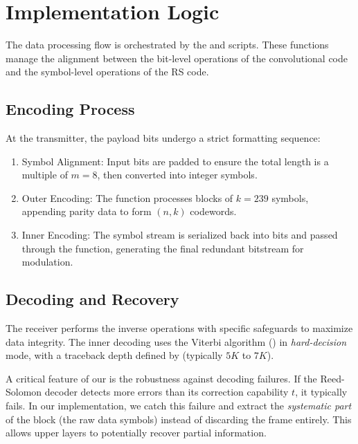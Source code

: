 \section{Implementation Logic} \label{sec:Coding_Implementation}

The data processing flow is orchestrated by the  and  scripts. These functions manage the alignment between the bit-level operations of the convolutional code and the symbol-level operations of the RS code.

\subsection{Encoding Process}

At the transmitter, the payload bits undergo a strict formatting sequence:
\begin{enumerate}
    \item \textsf{Symbol Alignment:} Input bits are padded to ensure the total length is a multiple of $m=8$, then converted into integer symbols.
    \item \textsf{Outer Encoding:} The  function processes blocks of $k=239$ symbols, appending parity data to form $(n,k)$ codewords.
    \item \textsf{Inner Encoding:} The symbol stream is serialized back into bits and passed through the  function, generating the final redundant bitstream for modulation.
\end{enumerate}

\subsection{Decoding and Recovery}

The receiver performs the inverse operations with specific safeguards to maximize data integrity. The inner decoding uses the Viterbi algorithm () in \emph{hard-decision} mode, with a traceback depth defined by  (typically $5K$ to $7K$).

\begin{remark}
    A critical feature of our  is the robustness against decoding failures.
    If the Reed-Solomon decoder detects more errors than its correction capability $t$, it typically fails.
    In our implementation, we catch this failure and extract the \emph{systematic part} of the block (the raw data symbols) instead of discarding the frame entirely. This allows upper layers to potentially recover partial information.
\end{remark}


